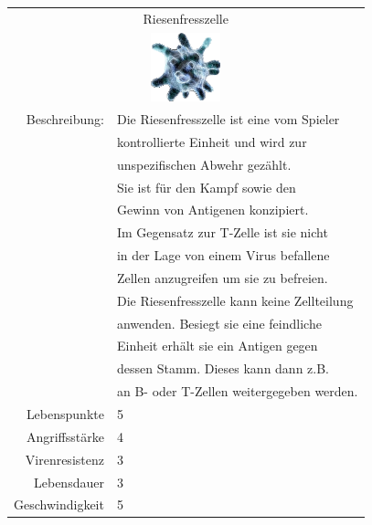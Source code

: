 \documentclass[11pt]{article}
\begin{document}
\begin{tabular}{|r|l|}
\hline
\multicolumn{2}{c}{Riesenfresszelle}\\
\multicolumn{2}{c}{\includegraphics[width=2.0cm]{fresszelleorig.png}}\\\hline\hline
Beschreibung:	& Die Riesenfresszelle ist eine vom Spieler\\
			& kontrollierte Einheit und wird zur\\
			& unspezifischen Abwehr gez\"ahlt.\\
			& Sie ist f\"ur den Kampf sowie den\\
			& Gewinn von Antigenen konzipiert.\\
			& Im Gegensatz zur T-Zelle ist sie nicht\\
			& in der Lage von einem Virus befallene\\
			& Zellen anzugreifen um sie zu befreien.\\
			& Die Riesenfresszelle kann keine Zellteilung\\
			& anwenden. Besiegt sie eine feindliche\\
			& Einheit erh\"alt sie ein Antigen gegen\\
			& dessen Stamm. Dieses kann dann z.B.\\
			& an B- oder T-Zellen weitergegeben werden.\\\hline
Lebenspunkte	& 5\\\hline
Angriffsst\"arke	& 4\\\hline
Virenresistenz	& 3\\\hline
Lebensdauer		& 3\\\hline
Geschwindigkeit	& 5\\\hline
\end{tabular}
\end{document}
